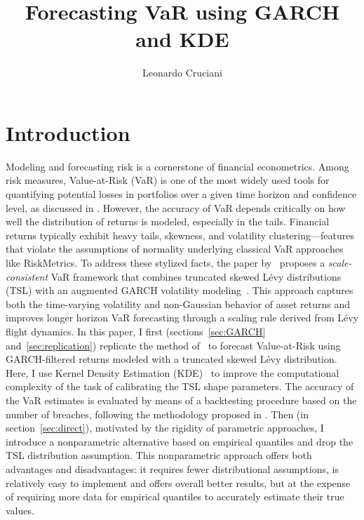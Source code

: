 \documentclass[11pt]{article}
\author{Leonardo Cruciani}
\title{Forecasting VaR using GARCH and KDE}
\begin{document}
    \maketitle
    \section{Introduction}
    \label{sec:introduction}
    Modeling and forecasting risk is a cornerstone of financial econometrics.
    Among risk measures, Value-at-Risk (VaR) is one of the most widely used tools for quantifying potential losses in portfolios over a given time horizon and confidence level, as discussed in \textcite{jorion2006value}.
    However, the accuracy of VaR depends critically on how well the distribution of returns is modeled, especially in the tails.
    Financial returns typically exhibit heavy tails, skewness, and volatility clustering—features that violate the assumptions of normality underlying classical VaR approaches like RiskMetrics.
    To address these stylized facts, the paper by~\textcite{thorsten} proposes a \textit{scale-consistent} VaR framework that combines truncated skewed Lévy distributions (TSL) with an augmented GARCH volatility modeling~\parencite{pagan1990alternative}.
    This approach captures both the time-varying volatility and non-Gaussian behavior of asset returns and improves longer horizon VaR forecasting through a scaling rule derived from Lévy flight dynamics.
    In this paper, I first (sections~\ref{sec:GARCH} and~\ref{sec:replication}) replicate the method of~\textcite{thorsten} to forecast Value-at-Risk using GARCH-filtered returns modeled with a truncated skewed Lévy distribution.
    Here, I use Kernel Density Estimation (KDE)~\parencite{silverman1986density} to improve the computational complexity of the task of calibrating the TSL shape parameters.
    The accuracy of the VaR estimates is evaluated by means of a backtesting procedure based on the number of breaches, following the methodology proposed in \textcite{christoffersen2003elements}.
    Then (in section~\ref{sec:direct}), motivated by the rigidity of parametric approaches, I introduce a nonparametric alternative based on empirical quantiles and drop the TSL distribution assumption.
    This nonparametric approach offers both advantages and disadvantages: it requires fewer distributional assumptions, is relatively easy to implement and offers overall better results, but at the expense of requiring more data for empirical quantiles to accurately estimate their true values.
\end{document}
